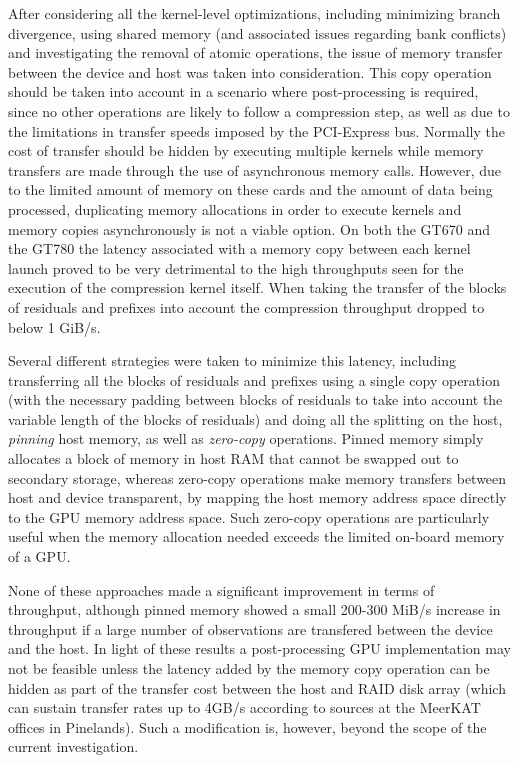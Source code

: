   After considering all the kernel-level optimizations, including minimizing branch divergence, using shared memory (and associated issues regarding bank conflicts) and investigating the removal of atomic 
  operations, the issue of memory transfer between the device and host was taken into consideration. This copy operation should be taken into account in a scenario where post-processing is required, since
  no other operations are likely to follow a compression step, as well as due to the limitations in transfer speeds imposed by the PCI-Express bus. Normally the cost of transfer should be hidden by executing multiple 
  kernels while memory transfers are made through the use of asynchronous memory calls. However, due to the limited amount of memory on these cards and the amount of data being processed, duplicating memory allocations
  in order to execute kernels and memory copies asynchronously is not a viable option. On both the GT670 and the GT780 the latency associated with a memory copy between each kernel launch proved to be very detrimental to
  the high throughputs seen for the execution of the compression kernel itself. When taking the transfer of the blocks of residuals and prefixes into account the compression throughput dropped to below 1 GiB/s.
  
  Several different strategies were taken to minimize this latency, including transferring all the blocks of residuals and prefixes using a single copy operation (with the necessary padding between blocks of residuals to
  take into account the variable length of the blocks of residuals) and doing all the splitting on the host, \textit{pinning} host memory, as well as \textit{zero-copy} operations. Pinned memory simply allocates a block 
  of memory in host RAM that cannot be swapped out to secondary storage, whereas zero-copy operations make memory transfers between host and device transparent, by mapping the host memory address space directly to the GPU memory 
  address space. Such zero-copy operations are particularly useful when the memory allocation needed exceeds the limited on-board memory of a GPU. 
  
  None of these approaches made a significant improvement in terms of throughput, although pinned memory showed a small 200-300 MiB/s increase in throughput if a large number of observations are transfered between the 
  device and the host. In light of these results a post-processing GPU implementation may not be feasible unless the latency added by the memory copy operation can be hidden as part of the transfer cost between the host and RAID disk
  array (which can sustain transfer rates up to 4GB/s according to sources at the MeerKAT offices in Pinelands). Such a modification is, however, beyond the scope of the current investigation.
